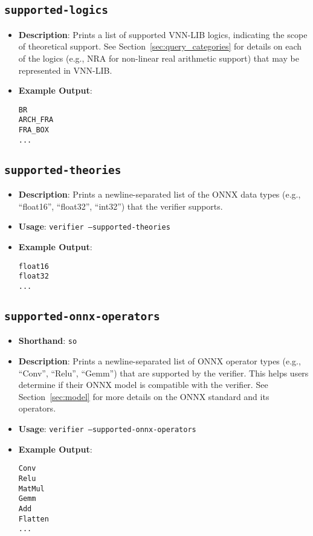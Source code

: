 \subsection{\texttt{supported-logics}}
\begin{itemize}
    \item \textbf{Description}: Prints a list of supported VNN-LIB logics, indicating the scope of theoretical support. See Section~\ref{sec:query_categories} for 
    details on each of the logics (e.g., NRA for non-linear real arithmetic support) that may be represented in VNN-LIB.
    \item \textbf{Example Output}:
    \begin{lstlisting}[style=bash, numbers=none, frame=none, backgroundcolor=\color{white}]
BR
ARCH_FRA
FRA_BOX
...
    \end{lstlisting}
\end{itemize}

\subsection{\texttt{supported-theories}}
\begin{itemize}
    \item \textbf{Description}: Prints a newline-separated list of the ONNX data types (e.g., ``float16'', ``float32'', ``int32'') that the verifier supports.
    \item \textbf{Usage}: \texttt{verifier --supported-theories}
    \item \textbf{Example Output}:
    \begin{lstlisting}[style=bash, numbers=none, frame=none, backgroundcolor=\color{white}]
float16
float32
...
    \end{lstlisting}
\end{itemize}

\subsection{\texttt{supported-onnx-operators}}
\begin{itemize}
    \item \textbf{Shorthand}: \texttt{so}
    \item \textbf{Description}: Prints a newline-separated list of ONNX operator types (e.g., ``Conv'', ``Relu'', ``Gemm'') that are supported by the verifier. 
	This helps users determine if their ONNX model is compatible with the verifier. See Section~\ref{sec:model} for more details on the ONNX standard and its operators.
    \item \textbf{Usage}: \texttt{verifier --supported-onnx-operators}
    \item \textbf{Example Output}:
    \begin{lstlisting}[style=bash, numbers=none, frame=none, backgroundcolor=\color{white}]
Conv
Relu
MatMul
Gemm
Add
Flatten
...
    \end{lstlisting}
\end{itemize}

